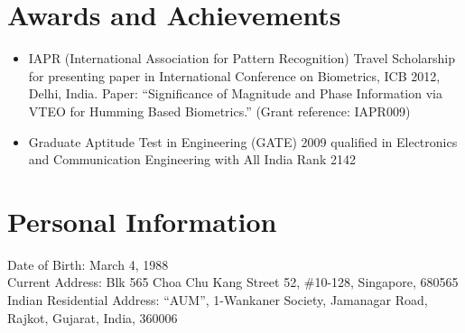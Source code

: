\documentclass[10pt]{article}
\begin{document}
\section*{Awards and Achievements}

\begin{itemize}
\item IAPR (International Association for Pattern Recognition) Travel Scholarship for presenting paper in International Conference on Biometrics, ICB 2012, Delhi, India. Paper: ``Significance of Magnitude and Phase Information via VTEO for Humming Based Biometrics.'' (Grant reference: IAPR009)

\item Graduate Aptitude Test in Engineering (GATE) 2009 qualified in Electronics and Communication Engineering with All India Rank 2142
\end{itemize}

\section*{Personal Information}

Date of Birth: March 4, 1988 \\
Current Address: Blk 565 Choa Chu Kang Street 52, \#10-128, Singapore, 680565 \\
Indian Residential Address: ``AUM'', 1-Wankaner Society, Jamanagar Road, Rajkot, Gujarat, India, 360006
\end{document}
